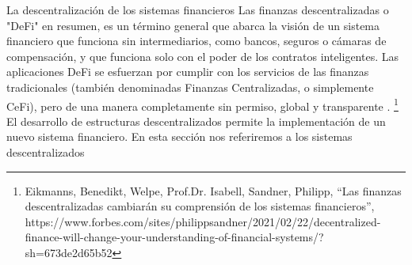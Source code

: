 \documentclass[12pt]{report} %
\begin{document}
La descentralización de los sistemas financieros
Las finanzas descentralizadas o "DeFi" en resumen, es un término general que abarca la visión de un sistema financiero que funciona sin intermediarios, como bancos, seguros o cámaras de compensación, y que funciona solo con el poder de los contratos inteligentes. Las aplicaciones DeFi se esfuerzan por cumplir con los servicios de las finanzas tradicionales (también denominadas Finanzas Centralizadas, o simplemente CeFi), pero de una manera completamente sin permiso, global y transparente . \footnote{Eikmanns, Benedikt, Welpe, Prof.Dr. Isabell, Sandner, Philipp, “Las finanzas descentralizadas cambiarán su comprensión de los sistemas financieros”, https://www.forbes.com/sites/philippsandner/2021/02/22/decentralized-finance-will-change-your-understanding-of-financial-systems/?sh=673de2d65b52}
El desarrollo de estructuras descentralizados permite la implementación de un nuevo sistema financiero. En esta sección nos referiremos a los sistemas descentralizados 
\end{document}
